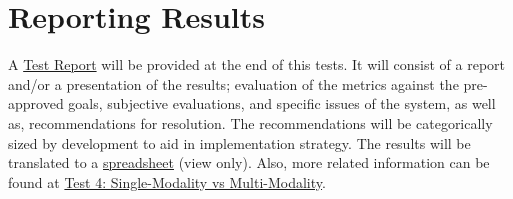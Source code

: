 \section{Reporting Results}

A \hyperlink{https://github.com/MIMBCD-UI/research-reports}{Test Report} will be provided at the end of this tests. It will consist of a report and/or a presentation of the results; evaluation of the metrics against the pre-approved goals, subjective evaluations, and specific issues of the system, as well as, recommendations for resolution. The recommendations will be categorically sized by development to aid in implementation strategy. The results will be translated to a \hyperlink{https://docs.google.com/spreadsheets/d/1YaOugDtaTZ1kTFgx2RKt-EkeHDzg5BH_plYmC7E1MT0/edit?usp=sharing}{spreadsheet} (view only). Also, more related information can be found at \hyperlink{https://github.com/MIMBCD-UI/prototype-breast-screening/wiki/User-Test-Evaluation}{Test 4: Single-Modality vs Multi-Modality}.
